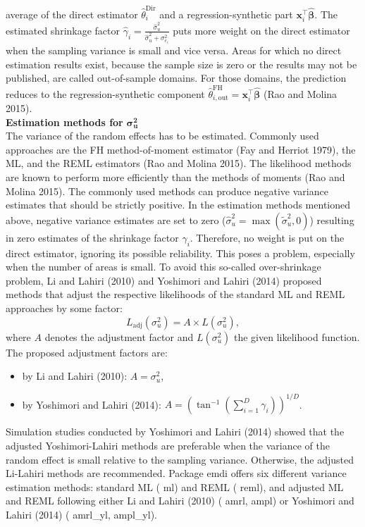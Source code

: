 average of the direct estimator \(\hat{\theta}_i^{\text{Dir}}\) and a
regression-synthetic part
\(\boldsymbol{x}_i^{\top}\boldsymbol{\hat{\beta}}\). The estimated
shrinkage factor
\(\hat{\gamma}_i=\frac{\hat{\sigma}_u^2}{\hat{\sigma}_u^2+\sigma_{e_{i}}^2}\)
puts more weight on the direct estimator when the sampling variance is
small and vice versa. Areas for which no direct estimation results
exist, because the sample size is zero or the results may not be
published, are called out-of-sample domains. For those domains, the
prediction reduces to the regression-synthetic component
\(\hat{\theta}_{i,\text{out}}^{\text{FH}} = \boldsymbol{x}_i^{\top}\boldsymbol{\hat{\beta}}\) (Rao and Molina 2015).\\
\textbf{Estimation methods for} \(\boldsymbol{\sigma_u^2}\)\\
The variance of the random effects has to be estimated. Commonly used
approaches are the FH method-of-moment estimator (Fay and Herriot 1979), the ML, and
the REML estimators (Rao and Molina 2015). The likelihood methods are known to
perform more efficiently than the methods of moments (Rao and Molina 2015). The
commonly used methods can produce negative variance estimates that
should be strictly positive. In the estimation methods mentioned above,
negative variance estimates are set to zero (\(\hat{\sigma}_{u}^{2} = \max\left(\tilde{\sigma}_{u}^{2}, 0\right)\)) resulting in zero estimates
of the shrinkage factor \(\gamma_i\). Therefore, no weight is put on the
direct estimator, ignoring its possible reliability. This poses a
problem, especially when the number of areas is small. To avoid this
so-called over-shrinkage problem, Li and Lahiri (2010) and Yoshimori and Lahiri (2014) proposed
methods that adjust the respective likelihoods of the standard ML and
REML approaches by some factor:
\[L_{\text{adj}}\left(\sigma_u^{2}\right) = A \times L\left(\sigma_u^{2}\right),\]
where \(A\) denotes the adjustment factor and \(L(\sigma_u^{2})\) the given
likelihood function. The proposed adjustment factors are:

\begin{itemize}
\item
  by Li and Lahiri (2010): \(A = \sigma_u^{2}\),
\item
  by Yoshimori and Lahiri (2014): \(A = \left( \tan^{-1} \left(\sum\limits_{i=1}^{D}  \gamma_i \right)\right)^{1/D}\).
\end{itemize}

Simulation studies conducted by Yoshimori and Lahiri (2014) showed that the adjusted
Yoshimori-Lahiri methods are preferable when the variance of the random
effect is small relative to the sampling variance. Otherwise, the
adjusted Li-Lahiri methods are recommended. Package emdi offers six
different variance estimation methods: standard ML ( ml) and REML (
reml), and adjusted ML and REML following either Li and Lahiri (2010) ( amrl, ampl)
or Yoshimori and Lahiri (2014) ( amrl\_yl, ampl\_yl).

